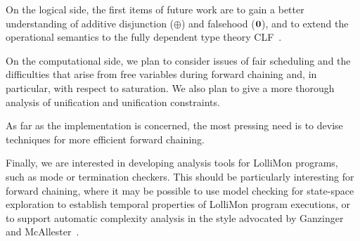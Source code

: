 \documentclass{sig-alt}
\begin{document}
On the logical side, the first items of future work are to gain a better
understanding of additive disjunction ($\oplus$) and falsehood
($\textbf{0}$), and to extend the operational semantics to the fully
dependent type theory CLF~\cite{Watkins02tr}.

On the computational side, we plan to consider issues of fair scheduling
and the difficulties that arise from free variables during forward
chaining and, in particular, with respect to saturation.  We also plan to
give a more thorough analysis of unification and unification
constraints.

As far as the implementation is concerned, the most pressing need is to
devise techniques for more efficient forward chaining.

Finally, we are interested in developing analysis tools for LolliMon
programs, such as mode or termination checkers.  This should be
particularly interesting for forward chaining, where it may be possible
to use model checking for state-space exploration to establish temporal
properties of LolliMon program executions, or to support automatic
complexity analysis in the style advocated by Ganzinger and
McAllester~\cite{Ganzinger01ijcar}.

\ignore{


}
\end{document}
